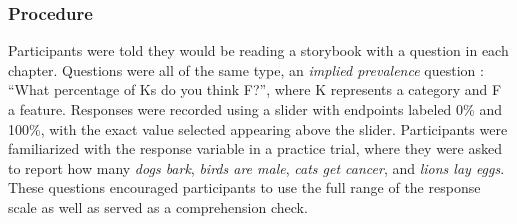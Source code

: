 \documentclass[10pt,letterpaper]{article}
\newcommand\Tstrut{\rule{0pt}{2.6ex}}       %
\newcommand\Bstrut{\rule[-1ex]{0pt}{0pt}} %
\newcommand{\TBstrut}{\Tstrut\Bstrut} %
\begin{document}


\subsubsection{Procedure}
Participants were told they would be reading a storybook with a question in each chapter. 
Questions were all of the same type, an \emph{implied prevalence} question \cite{Gelman2002, Cimpian2010}: ``What percentage of Ks do you think F?'', where K represents a category and F a feature. 
Responses were recorded using a slider with endpoints labeled 0\% and 100\%, with the exact value selected appearing above the slider. 
Participants were familiarized with the response variable in a practice trial, where they were asked to report how many \emph{dogs bark}, \emph{birds are male}, \emph{cats get cancer}, and \emph{lions lay eggs}. 
These questions encouraged participants to use the full range of the response scale as well as served as a comprehension check. 
\end{document}
